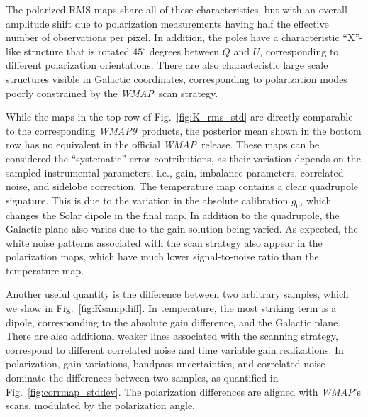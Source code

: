 \documentclass[twocolumn]{../../common/aa}
\def\WMAP{\emph{WMAP}}
\def\WMAPnine{\emph{WMAP9}}
\begin{document}
The polarized RMS maps share all of these characteristics, but with an overall amplitude shift due to polarization measurements having half the effective number of observations per pixel. In addition, the poles have a characteristic ``X''-like structure that is rotated $45^\circ$ degrees between $Q$ and $U$, corresponding to different polarization orientations. There are also characteristic large scale structures visible in Galactic coordinates, corresponding to polarization modes poorly constrained by the \WMAP\ scan strategy.

While the maps in the top row of Fig.~\ref{fig:K_rms_std} are directly comparable to the corresponding \WMAPnine\ products, the posterior mean shown in the bottom row has no equivalent in the official \WMAP\ release. These maps can be considered the ``systematic'' error contributions, as their variation depends on the sampled instrumental parameters, i.e., gain, imbalance parameters, correlated noise, and sidelobe correction. The temperature map contains a clear quadrupole signature. This is due to the variation in the absolute calibration $g_0$, which changes the Solar dipole in the final map. In addition to the quadrupole, the Galactic plane also varies due to the gain solution being varied. As expected, the white noise patterns associated with the scan strategy also appear in the polarization maps, which have much lower signal-to-noise ratio than the temperature map. %


Another useful quantity is the difference between two arbitrary samples, which we show in Fig.~\ref{fig:Ksampdiff}. In temperature, the most striking term is a dipole, corresponding to the absolute gain difference, and the Galactic plane. There are also additional weaker lines associated with the scanning strategy, correspond to different correlated noise and time variable gain realizations. In polarization, gain variations,  bandpass uncertainties, and correlated noise dominate the differences between two samples, as quantified in Fig.~\ref{fig:corrmap_stddev}. The polarization differences are aligned with \WMAP's scans, modulated by the polarization angle.
\end{document}
